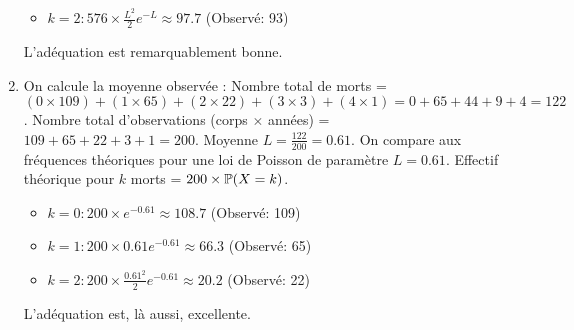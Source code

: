 \documentclass[solutions]{exercices}
\begin{document}
\begin{solution}
\begin{enumerate}
\begin{itemize}
        \item $k=2: 576 \times \frac{L^2}{2} e^{-L} \approx 97.7$ (Observé: 93)
    \end{itemize}
    L'adéquation est remarquablement bonne.
    \item On calcule la moyenne observée :
    Nombre total de morts = $(0 \times 109) + (1 \times 65) + (2 \times 22) + (3 \times 3) + (4 \times 1) = 0+65+44+9+4 = 122$.
    Nombre total d'observations (corps $\times$ années) = $109+65+22+3+1 = 200$.
    Moyenne $L = \frac{122}{200} = 0.61$.
    On compare aux fréquences théoriques pour une loi de Poisson de paramètre $L=0.61$. Effectif théorique pour $k$ morts = $200 \times \P(X=k)$.
    \begin{itemize}
        \item $k=0: 200 \times e^{-0.61} \approx 108.7$ (Observé: 109)
        \item $k=1: 200 \times 0.61 e^{-0.61} \approx 66.3$ (Observé: 65)
        \item $k=2: 200 \times \frac{0.61^2}{2} e^{-0.61} \approx 20.2$ (Observé: 22)
    \end{itemize}
    L'adéquation est, là aussi, excellente.
\end{enumerate}
\end{solution}
\end{document}
